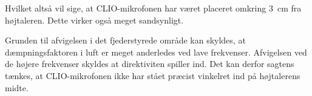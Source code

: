 Hvilket altså vil sige, at CLIO-mikrofonen har været placeret omkring \SI{3}{\centi\meter} fra højtaleren. Dette virker også meget sandsynligt.

Grunden til afvigelsen i det fjederstyrede område kan skyldes, at dæmpningsfaktoren i luft er meget anderledes ved lave frekvenser. Afvigelsen ved de højere frekvenser skyldes at direktiviten spiller ind. Det kan derfor sagtens tænkes, at CLIO-mikrofonen ikke har stået præcist vinkelret ind på højtalerens midte. 
